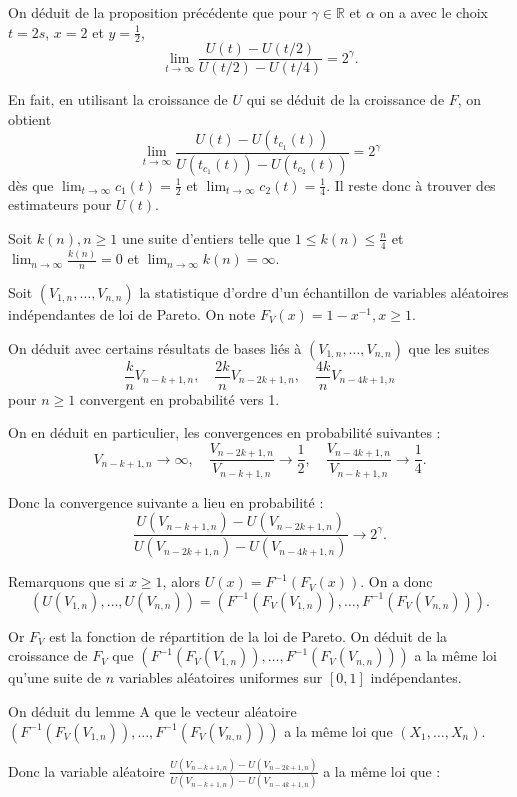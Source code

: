 \documentclass{article}
\begin{document}
On déduit de la proposition précédente que pour $\gamma \in \mathbb{R}$ et $\alpha$ on a avec le choix $t = 2s$, $x = 2$ et $y = \frac{1}{2}$,
\[
\lim_{t \to \infty} \frac{U(t) - U(t/2)}{U(t/2) - U(t/4)} = 2^{\gamma}.
\]

En fait, en utilisant la croissance de $U$ qui se déduit de la croissance de $F$, on obtient
\[
\lim_{t \to \infty} \frac{U(t) - U(t_{c_1}(t))}{U(t_{c_1}(t)) - U(t_{c_2}(t))} = 2^{\gamma}
\]
dès que $\lim_{t \to \infty} c_1(t) = \frac{1}{2}$ et $\lim_{t \to \infty} c_2(t) = \frac{1}{4}$. Il reste donc à trouver des estimateurs pour $U(t)$.

Soit $k(n), n \geq 1$ une suite d’entiers telle que $1 \leq k(n) \leq \frac{n}{4}$ et $\lim_{n \to \infty} \frac{k(n)}{n} = 0$ et $\lim_{n \to \infty} k(n) = \infty$.

Soit $(V_{1,n},\dots,V_{n,n})$ la statistique d’ordre d’un échantillon de variables aléatoires indépendantes de loi de Pareto. On note $F_V(x) = 1 - x^{-1}, x \geq 1$.

On déduit avec certains résultats de bases liés à $(V_{1,n},\dots,V_{n,n})$ que les suites
\[
\frac{k}{n} V_{n-k+1,n}, \quad \frac{2k}{n} V_{n-2k+1,n}, \quad \frac{4k}{n} V_{n-4k+1,n}
\]
pour \(n \geq 1\) convergent en probabilité vers 1.

On en déduit en particulier, les convergences en probabilité suivantes :
\[
V_{n-k+1,n}  \to \infty, \quad \frac{V_{n-2k+1,n}}{V_{n-k+1,n}} \to \frac{1}{2}, \quad \frac{V_{n-4k+1,n}}{V_{n-k+1,n}} \to \frac{1}{4}.
\]

Donc la convergence suivante a lieu en probabilité :
\[
\frac{U(V_{n-k+1,n}) - U(V_{n-2k+1,n})}{U(V_{n-2k+1,n}) - U(V_{n-4k+1,n})} \to 2^{\gamma}.
\]

Remarquons que si $x \geq 1$, alors $U(x) = F^{-1}(F_V(x))$. On a donc
\[
(U(V_{1,n}), \dots, U(V_{n,n})) = (F^{-1}(F_V(V_{1,n})), \dots, F^{-1}(F_V(V_{n,n}))).
\]

Or \(F_V\) est la fonction de répartition de la loi de Pareto. \newline
On déduit de la croissance de $F_V$ que $(F^{-1}(F_V(V_{1,n})),\dots, F^{-1}(F_V(V_{n,n})))$ a la même loi qu’une suite de $n$ variables aléatoires uniformes sur $[0,1]$ indépendantes. 

On déduit du lemme A que le vecteur aléatoire $(F^{-1}(F_V(V_{1,n})),\dots, F^{-1}(F_V(V_{n,n})))$ a la même loi que $(X_1,\dots,X_n)$. 

Donc la variable aléatoire \(\frac{U(V_{n-k+1,n}) - U(V_{n-2k+1,n})}{U(V_{n-k+1,n}) - U(V_{n-4k+1,n})}\) a la même loi que :
\end{document}

